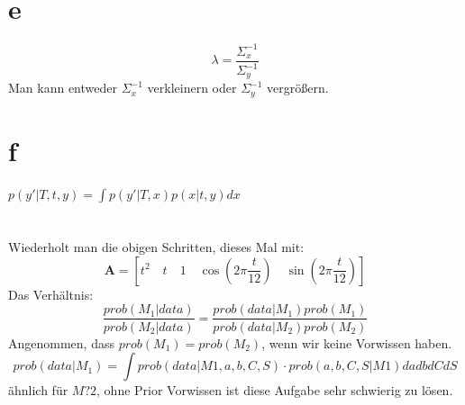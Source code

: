 \section{e}
\begin{equation*}
	\lambda = \frac{\Sigma_x^{-1}}{\Sigma_y^{-1}}
\end{equation*}
Man kann entweder $\Sigma_x^{-1}$ verkleinern oder $\Sigma_y^{-1}$ vergrößern.
\section{f}
$p(y'|T,t,y) = \int p(y'|T,x) p(x|t,y)dx$
\begin{figure}[htpb]\centering
	\caption{}
	\label{fig:paradist2}
\end{figure}
\clearpage
\section{}
Wiederholt man die obigen Schritten, dieses Mal mit:
\begin{equation*}
	\bm{A} = \left[t^2\quad t \quad  1 \quad \cos(2 \pi \frac{t}{12}) \quad \sin(2\pi\frac{t}{12})\right]
\end{equation*}
Das Verhältnis:
\begin{equation*}
	\frac{prob(M_1 | data)}{prob(M_2 | data)} = \frac{prob(data|M_1)prob(M_1)}{prob(data|M_2)prob(M_2)}
\end{equation*}
Angenommen, dass $prob(M_1) = prob(M_2)$, wenn wir keine Vorwissen haben.
\begin{equation*}
	prob(data|M_1) = \int prob(data|M1,a,b,C,S) \cdot prob(a,b,C,S|M1) dadbdCdS
\end{equation*}
ähnlich für $M?2$, ohne Prior Vorwissen ist diese Aufgabe sehr schwierig zu lösen. 